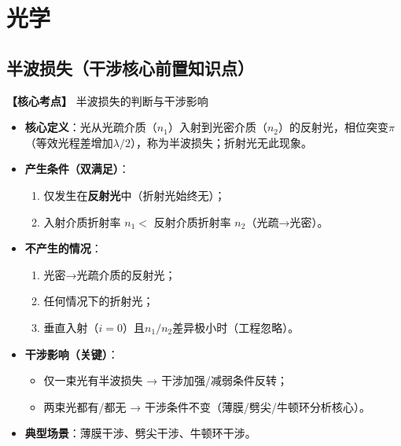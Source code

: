 
\section{光学}

\subsection{半波损失（干涉核心前置知识点）}
\textbf{【核心考点】} 半波损失的判断与干涉影响 \par\vspace{0.3em}
\begin{itemize}
    \item \textbf{核心定义}：光从光疏介质（$n_1$）入射到光密介质（$n_2$）的反射光，相位突变$\pi$（等效光程差增加$\lambda/2$），称为半波损失；折射光无此现象。
    \item \textbf{产生条件（双满足）}：
          \begin{enumerate}
              \item 仅发生在\textbf{反射光}中（折射光始终无）；
              \item 入射介质折射率 $n_1 < $ 反射介质折射率 $n_2$（光疏→光密）。
          \end{enumerate}
    \item \textbf{不产生的情况}：
          \begin{enumerate}
              \item 光密→光疏介质的反射光；
              \item 任何情况下的折射光；
              \item 垂直入射（$i=0$）且$n_1/n_2$差异极小时（工程忽略）。
          \end{enumerate}
    \item \textbf{干涉影响（关键）}：
          \begin{itemize}
              \item 仅一束光有半波损失 → 干涉加强/减弱条件反转；
              \item 两束光都有/都无 → 干涉条件不变（薄膜/劈尖/牛顿环分析核心）。
          \end{itemize}
    \item \textbf{典型场景}：薄膜干涉、劈尖干涉、牛顿环干涉。
\end{itemize}

